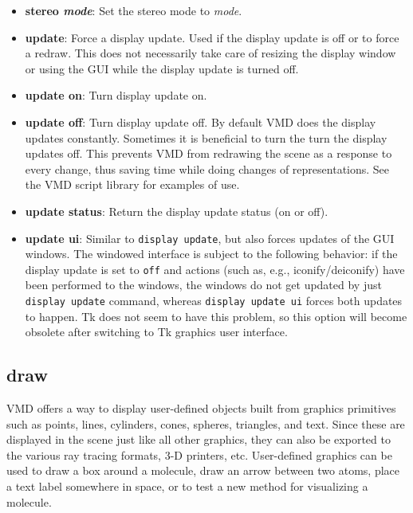 \begin{itemize}
\item {\bf  stereo {\it mode}}: Set the stereo mode to {\it mode}.

\item {\bf update}: Force a display update. Used if the display 
  update is off or to force a redraw. This does not necessarily take care 
  of resizing the display window or using the GUI while the display 
  update is turned off.
\item {\bf update on}: Turn display update on. 
\item {\bf update off}: Turn display update off. By default VMD does the
  display updates constantly. Sometimes it is beneficial to turn the turn
  the display updates off. This prevents VMD from redrawing the scene 
  as a response to every change, thus saving time while doing changes of 
  representations.  See the VMD script library for examples of use.
\item {\bf update status}: Return the display update status (on or off).
\item {\bf update ui}: Similar to {\tt display update}, but also forces
  updates of the GUI windows. The windowed interface is subject to the
  following behavior: if the display update is set to {\tt off} and 
  actions (such as, e.g., iconify/deiconify)
  have been performed to the windows, the windows do not get updated 
  by just {\tt display update} command, whereas {\tt display update ui}
  forces both updates to happen. Tk does not seem to have this problem,
  so this option will become obsolete after switching to Tk graphics user
  interface. 


\end{itemize}

\subsection{draw}
\label{ug:ui:text:draw}
VMD offers a way to display user-defined objects built from graphics
primitives such as 
points, lines, cylinders, cones, spheres, triangles, and text.  
Since these are displayed in the scene just like all other graphics, 
they can also be exported to the various ray tracing formats, 3-D printers, 
etc.
User-defined graphics can be used to draw a box around a molecule, draw
an arrow between two atoms, place a text label somewhere in space,
or to test a new method for visualizing a molecule.  

